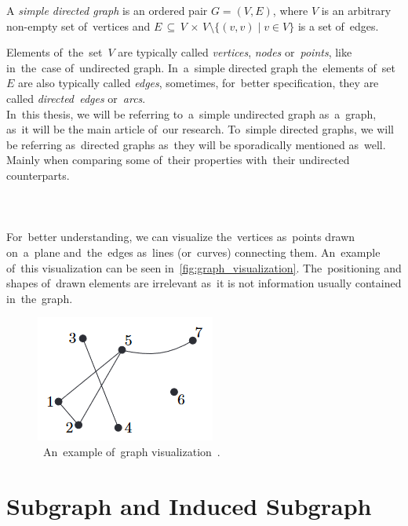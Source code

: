 \fi
\begin{definition}
    A \emph{simple directed graph} is an ordered pair ${G = (V, E)}$, where $V$ is an arbitrary non-empty set of~vertices and $E\,\subseteq\,V\,\times\,V \setminus \{(v, v)\mid v \in V\}$ is a set of~edges.
\end{definition} 
Elements of~the~set~$V$ are typically called \textit{vertices}, \textit{nodes} or~\textit{points}, like in~the~case of~undirected graph. In~a~simple directed graph the~elements of~set~$E$ are also typically called \textit{edges}, sometimes, for~better specification, they are called \textit{directed~edges} or~\textit{arcs}.\\
In~this thesis, we will be referring to~a~simple undirected graph as~a~graph, as~it will be the main article of~our research. To~simple directed graphs, we will be referring as~directed graphs as~they will be sporadically mentioned as~well. Mainly when comparing some of~their properties with~their undirected counterparts. \\
\\
\\
\\
For~better understanding, we can visualize the~vertices as~points drawn on~a~plane and~the~edges as~lines (or~curves) connecting them. An~example of~this visualization can be seen in~\autoref{fig:graph_visualization}. The~positioning and shapes of~drawn elements are irrelevant as~it is not information usually contained in~the~graph.

\begin{figure}[h]
    \centering
    \includegraphics[width=0.5\linewidth]{graph_drawn.png}
    \caption[An~example of~graph visualization]{~An~example of~graph visualization~\cite{Diestel}.}
    \label{fig:graph_visualization}
\end{figure}
\section{Subgraph and Induced Subgraph}

